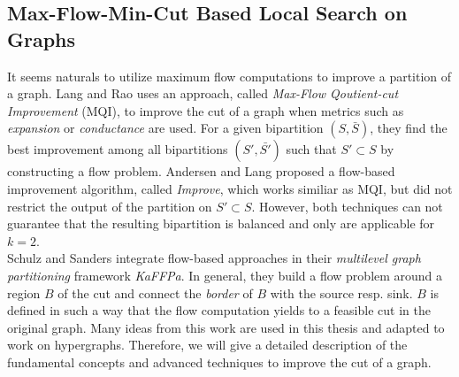 
\subsection{Max-Flow-Min-Cut Based Local Search on Graphs}
\label{sec:flow_local_search_graph}

It seems naturals to utilize maximum flow computations to improve a 
partition of a graph. Lang and Rao \cite{lang2004flow} uses an approach,
called \emph{Max-Flow Qoutient-cut Improvement} (MQI), to improve the cut
of a graph when metrics such as \emph{expansion} or \emph{conductance}
are used. For a given bipartition $(S,\bar{S})$, they find the best 
improvement among all bipartitions $(S',\bar{S'})$ such that $S' \subset S$
by constructing a flow problem. Andersen and Lang \cite{andersen2008algorithm}
proposed a flow-based improvement algorithm, called \emph{Improve},
which works similiar as MQI, but did not restrict the output of the 
partition on $S' \subset S$. However, both techniques can not guarantee 
that the resulting bipartition is balanced and only are applicable for $k=2$. \\
Schulz and Sanders \cite{sanders2011engineering} integrate flow-based approaches 
in their \emph{multilevel graph partitioning} framework \emph{KaFFPa}. In general,
they build a flow problem around a region $B$ of the cut and connect the \emph{border} 
of $B$ with the source resp. sink. $B$ is defined in such a way that the flow computation
yields to a feasible cut in the original graph. Many ideas from this work are used in this
thesis and adapted to work on hypergraphs. Therefore, we will give a detailed description
of the fundamental concepts and advanced techniques to improve the cut of a graph.


